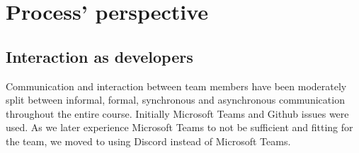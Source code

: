     \section{Process' perspective}






\subsection{Interaction as developers}
Communication and interaction between team members have been moderately split between informal, formal, synchronous and asynchronous communication throughout the entire course. Initially Microsoft Teams and Github issues were used. As we later experience Microsoft Teams to not be sufficient and fitting for the team, we moved to using Discord instead of Microsoft Teams.





